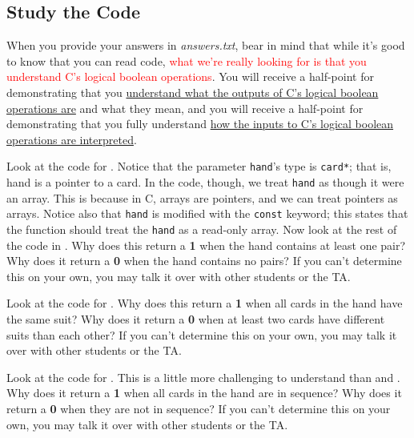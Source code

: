 \subsection{Study the Code} \label{subsec:studythecode}

When you provide your answers in \textit{answers.txt}, bear in mind that while it's good to know that you can read code, \textcolor{red}{what we're really looking for is that you understand C's logical boolean operations}.
You will receive a half-point for demonstrating that you \underline{understand what the outputs of C's logical boolean operations are} and what they mean,
and you will receive a half-point for demonstrating that you fully understand \underline{how the inputs to C's logical boolean operations are interpreted}.

Look at the code for .
Notice that the parameter \lstinline{hand}'s type is \lstinline{card*};
that is, \lstinline{}{hand} is a pointer to a \lstinline{}{card}.
In the code, though, we treat \lstinline{hand} as though it were an array.
This is because in C, arrays are pointers, and we can treat pointers as arrays.
Notice also that \lstinline{hand} is modified with the \lstinline{const} keyword;
this states that the  function should treat the \lstinline{hand} as a read-only array.
Now look at the rest of the code in .
Why does this return a \textbf{1} when the hand contains at least one pair?
Why does it return a \textbf{0} when the hand contains no pairs?
If you can't determine this on your own, you may talk it over with other students or the TA\@.
\begin{description}
\end{description}

Look at the code for .
Why does this return a \textbf{1} when all cards in the hand have the same suit?
Why does it return a \textbf{0} when at least two cards have different suits than each other?
If you can't determine this on your own, you may talk it over with other students or the TA\@.
\begin{description}
\end{description}

Look at the code for .
This is a little more challenging to understand than  and .
Why does it return a \textbf{1} when all cards in the hand are in sequence?
Why does it return a \textbf{0} when they are not in sequence?
If you can't determine this on your own, you may talk it over with other students or the TA\@.
\begin{description}
\end{description}

